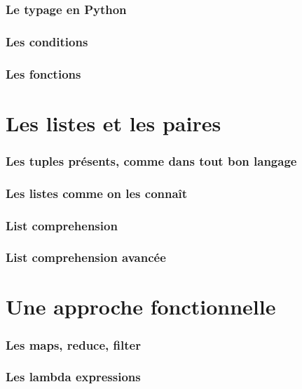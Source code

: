 \documentclass{beamer}
\begin{document}
\begin{frame}
  \frametitle{Le typage en Python}
\end{frame}

\begin{frame}
  \frametitle{Les conditions}
\end{frame}

\begin{frame}
  \frametitle{Les fonctions}
\end{frame}

\section{Les listes et les paires}
\label{sec:lists}

\begin{frame}
  \frametitle{Les tuples présents, comme dans tout bon langage}
\end{frame}

\begin{frame}
  \frametitle{Les listes comme on les connaît}
\end{frame}

\begin{frame}
  \frametitle{List comprehension}
\end{frame}

\begin{frame}
  \frametitle{List comprehension avancée}
\end{frame}

\section{Une approche fonctionnelle}
\label{sec:functionnal}

\begin{frame}
  \frametitle{Les maps, reduce, filter}
\end{frame}

\begin{frame}
  \frametitle{Les lambda expressions}
\end{frame}
\end{document}
